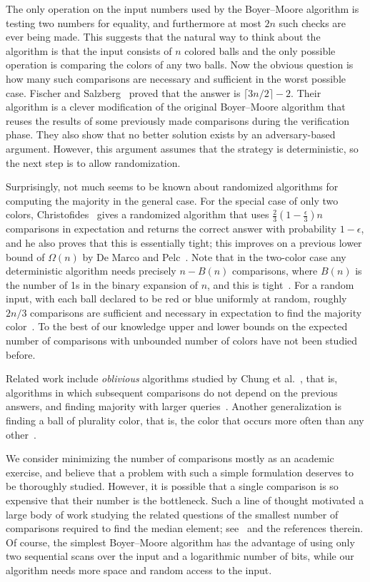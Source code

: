 \documentclass{article}[11pt,a4paper]
\begin{document}
The only operation on the input numbers used by the Boyer--Moore algorithm is testing
two numbers for equality, and furthermore at most $2n$ such checks are ever being made.
This suggests that the natural way to think about the algorithm is that the input consists
of $n$ colored balls and the only possible operation is comparing the colors of any two
balls. Now the obvious question is how many such comparisons are necessary and
sufficient in the worst possible case. Fischer and Salzberg~\cite{FischerSalzberg} proved that the answer is
$\lceil 3n/2\rceil-2$. Their algorithm is a clever modification of
the original Boyer--Moore algorithm that reuses the results of some previously made
comparisons during the verification phase. They also show that no better solution
exists by an adversary-based argument. However, this argument assumes that the
strategy is deterministic, so the next step is to allow randomization.

Surprisingly, not much seems to be known about randomized algorithms for computing
the majority in the general case. For the special case of only two colors, 
Christofides~\cite{Christofides} gives a randomized algorithm that uses $\frac{2}{3}(1-\frac{\epsilon}{3})n$
comparisons in expectation and returns the correct answer with probability $1-\epsilon$,
and he also proves that this is essentially tight; this improves on
a previous lower bound of $\Omega(n)$ by De Marco and Pelc~\cite{MarcoPelc}.
Note that in the two-color case any deterministic algorithm needs precisely $n-B(n)$ comparisons, where $B(n)$
is the number of 1s in the binary expansion of $n$, and this is 
tight~\cite{SaksWerman,AlonsoLowerbound,Wiener}. For a random input, with each
ball declared to be red or blue uniformly at random, roughly $2n/3$ comparisons
are sufficient and necessary in expectation to find the majority color~\cite{AlonsoAverage}.
To the best of our knowledge upper and lower bounds on the expected number
of comparisons with unbounded number of colors have not been studied
before.

Related work include \emph{oblivious} algorithms studied by Chung et al.~\cite{oblivious},
that is, algorithms in which subsequent comparisons do not depend on the previous answers,
and finding majority with larger queries~\cite{MarcoK15,Eppstein,VizerGKPPW15}.
Another generalization is finding a ball of plurality color, that is, the color that occurs
more often than any other~\cite{AignerMM05,GerbnerKPP13,KralST08}.

We consider minimizing the number of comparisons mostly as an academic exercise,
and believe that a problem with such a simple formulation deserves to be thoroughly
studied. However, it is possible that a single comparison is so expensive that their number
is the bottleneck. Such a line of thought motivated a large body of work
studying the related questions of the smallest number of comparisons required to find
the median element; see~\cite{DorZ99,DorZ01,paterson1996progress} and the references
therein. Of course, the simplest Boyer--Moore algorithm has the advantage of
using only two sequential
scans over the input and a logarithmic number of bits, while our algorithm
needs more space
and random access to the input.
\end{document}
